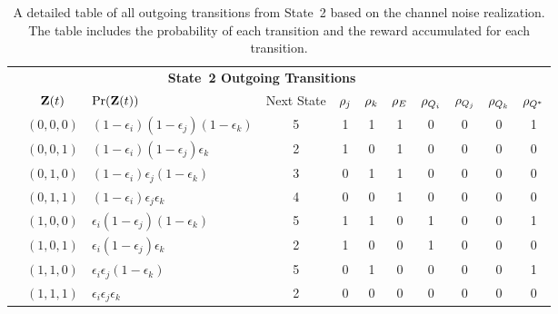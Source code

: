 
\setcounter{mymagicrownumbers}{0} 

\begin{table}
	\begin{center}
		\begin{tabular}{c c l *{8}{c}}
			\multicolumn{10}{c}{{\bf State~2 Outgoing Transitions}} \\		
			& $\mathbf{Z}(t)$              & $\operatorname{Pr}(\mathbf{Z}(t))$ & Next State & $\rho_{j}$ & $\rho_{k}$ & $\rho_{E}$ & $\rho_{Q_{i}}$ & $\rho_{Q_{j}}$ & $\rho_{Q_{k}}$ & $\rho_{Q^{*}}$\\
			\hline
			\myrownumber & $(0, 0, 0)$ & $(1 -\epsilon_i)(1 -\epsilon_j)(1 - \epsilon_k)$ & 5 &1 & 1 & 1 & 0 & 0 & 0 & 1 \\
			\myrownumber & $(0, 0, 1)$ & $(1 -\epsilon_i)(1 -\epsilon_j)\epsilon_k$ & 2 &1 & 0 & 1 & 0 & 0 & 0 & 0 \\
			\myrownumber & $(0, 1, 0)$ & $(1 -\epsilon_i)\epsilon_j(1 - \epsilon_k)$ & 3 & 0 & 1 & 1 & 0 & 0 & 0 & 0 \\
			\myrownumber & $(0, 1, 1)$ & $(1 -\epsilon_i)\epsilon_j\epsilon_k$ & 4 & 0 & 0 & 1 & 0 & 0 & 0 & 0 \\
			\myrownumber & $(1, 0, 0)$ & $\epsilon_i(1 -\epsilon_j)(1 - \epsilon_k)$ & 5 & 1 & 1 & 0 & 1 & 0 & 0 & 1 \\
			\myrownumber & $(1, 0, 1)$ & $\epsilon_i(1 -\epsilon_j)\epsilon_k$ & 2 &1 & 0 & 0 & 1 & 0 & 0 & 0 \\											\myrownumber & $(1, 1, 0)$ & $\epsilon_i\epsilon_j(1 - \epsilon_k)$ & 5 &0 & 1 & 0 & 0 & 0 & 0 & 1 \\
			\myrownumber & $(1, 1, 1)$ & $\epsilon_i\epsilon_j\epsilon_k$ & 2 &0 & 0 & 0 & 0 & 0 & 0 & 0 \\
		\end{tabular}
	\end{center}
	\caption{A detailed table of all outgoing transitions from State~2 based on the channel noise realization.  The table includes the probability of each transition and the reward accumulated for each transition.}	
	\label{tab:state2_transitions_all}
\end{table}

\setcounter{mymagicrownumbers}{0} 